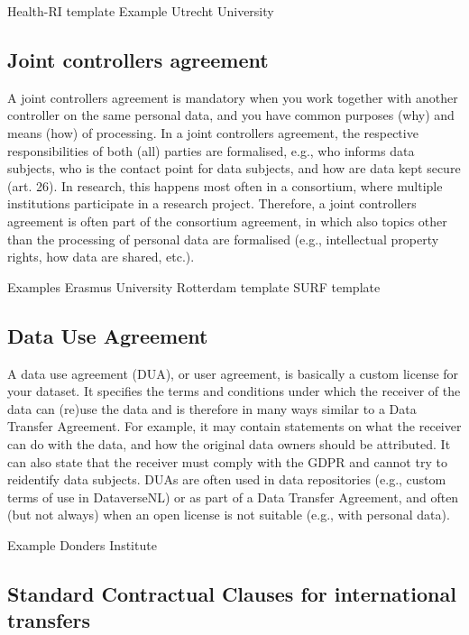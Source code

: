 \documentclass[
]{book}
\begin{document}
Health-RI template
Example Utrecht University

\hypertarget{joint-controller-agreement}{%
\subsection{Joint controllers agreement}\label{joint-controller-agreement}}

A joint controllers agreement is mandatory when you work together with another
controller on the same personal data, and you have common purposes (why) and
means (how) of processing. In a joint controllers agreement, the respective
responsibilities of both (all) parties are formalised, e.g., who informs data
subjects, who is the contact point for data subjects, and how are data kept
secure (art. 26).
In research, this happens most often in a consortium, where multiple institutions
participate in a research project. Therefore, a joint controllers agreement is
often part of the consortium agreement, in which also topics other than the
processing of personal data are formalised (e.g., intellectual property rights,
how data are shared, etc.).

Examples
Erasmus University Rotterdam template
SURF template

\hypertarget{user-agreement}{%
\subsection{Data Use Agreement}\label{user-agreement}}

A data use agreement (DUA), or user agreement, is basically a custom license for
your dataset. It specifies the terms and conditions under which the receiver of
the data can (re)use the data and is therefore in many ways similar to a
Data Transfer Agreement. For example,
it may contain statements on what the receiver can do with the data, and how
the original data owners should be attributed. It can also state that the
receiver must comply with the GDPR and cannot try to reidentify data subjects.
DUAs are often used in data repositories (e.g., custom terms of use in
DataverseNL) or as part of a Data Transfer Agreement, and often (but not always)
when an open license is not suitable (e.g., with personal data).

Example Donders Institute

\hypertarget{scc}{%
\subsection{Standard Contractual Clauses for international transfers}\label{scc}}
\end{document}
